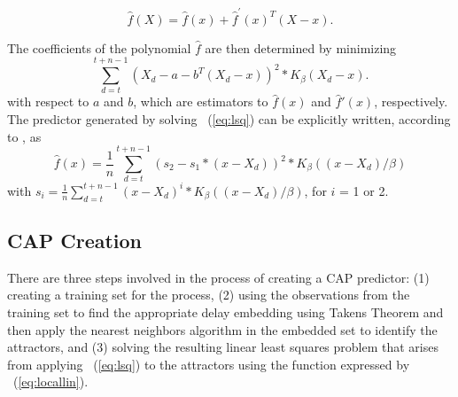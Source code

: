   \begin{equation}
    \label{eq:localtaylor}
    \hat{f}(X)=\hat{f}(x)+\hat{f}^{'}(x)^{T}(X-x).\nonumber
  \end{equation}

The coefficients of the polynomial $\hat{f}$ are then determined by minimizing
  \begin{equation}
    \label{eq:lsq}
    \displaystyle\sum_{d=t}^{t+n-1}\left(X_{d}-a-b^{T}(X_{d}-x)\right)^{2}*K_{\beta}(X_{d}-x).
  \end{equation}
 with respect to $a$ and $b$, which are estimators to
$\hat{f}(x)$ and $\hat{f}'(x)$, respectively.  The predictor generated
by solving \equationname~(\ref{eq:lsq}) can be explicitly written, according to
\cite{Box1994}, as
  \begin{equation}
    \label{eq:locallin}
    \hat{f}(x)=\frac{1}{n}\displaystyle\sum_{d=t}^{t+n-1}(s_{2}-s_{1}*(x-X_{d}))^{2}* K_{\beta}((x-X_{d})/\beta)
  \end{equation}
with $s_{i}=\frac{1}{n}\displaystyle\sum_{d=t}^{t+n-1}(x-X_{d})^{i}*K_{\beta}((x-X_{d})/\beta)$, for $i$ = 1 or 2.
\subsection{CAP Creation}
\label{sec:cappcreate}
There are three steps involved in the process of creating a CAP predictor:
(1) creating a training set for the process, (2) using the
observations from the training set to find the appropriate delay
embedding using Takens Theorem and then apply the nearest neighbors
algorithm in the embedded set to identify the attractors, and (3)
solving the resulting linear least squares problem that arises from
applying \equationname~(\ref{eq:lsq}) to the attractors using the
function expressed by \equationname~(\ref{eq:locallin}).

